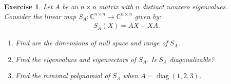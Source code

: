 \documentclass[11pt]{article}
\newtheorem{exercise}{Exercise}[section]
\theoremstyle{definition}
\numberwithin{equation}{subsection}
\begin{document}
\begin{exercise}
Let $A$ be an $n \times n$ matrix with $n$ distinct nonzero eigenvalues. Consider the linear map $S_A: \mathbb{C}^{n \times n} \to \mathbb{C}^{n \times n}$ given by:
\begin{align*}
    S_A(X) = AX - XA.
\end{align*}
\begin{enumerate}[label=(\alph*)]
    \item Find are the dimensions of null space and range of $S_A$.
    
    \item Find the eigenvalues and eigenvectors of $S_A$. Is $S_A$ diagonalizable?
    
    \item Find the minimal polynomial of $S_A$ when $A = \operatorname{diag}(1,2,3)$.
\end{enumerate}
\end{exercise}
\end{document}
